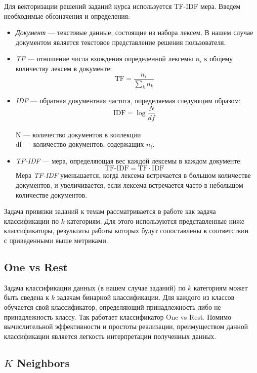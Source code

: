 \documentclass[14pt]{matmex-diploma-custom}
\begin{document}
Для векторизации решений заданий курса используется TF-IDF мера. Введем необходимые обозначения и определения:

\begin{itemize}
    \item \textit{Документ} --- текстовые данные, состоящие из набора лексем. В нашем случае документом является текстовое представление решения пользователя.
    \item \textit{TF } --- отношение числа вхождения определенной лексемы $n_{i}$ к общему количеству лексем в документе:
    \[
    \text{TF}=\frac{n_{i}}{\sum_{k}n_{k}}
    \]
    \item \textit{IDF } --- обратная документная частота, определяемая следующим образом: 
    \[
    \text{IDF}=\log\frac{N}{df}
    \]
    \\N --- количество документов в коллекции
    \\df --- количество документов, содержащих $n_{i}$.
    \item \textit{TF-IDF} --- мера, определяющая вес каждой лексемы в каждом документе:
    \[
    \text{TF-IDF}= \text{TF}\cdot\text{IDF}
    \]
    Мера \textit{TF-IDF} уменьшается, когда лексема встречается в большом количестве документов, и увеличивается, если лексема встречается часто в небольшом количестве документов.
\end{itemize}

Задача привязки заданий к темам рассматривается в работе как задача классификации по $k$ категориям. Для этого используются представленные ниже классификаторы, результаты работы которых будут сопоставлены в соответствии с приведенными выше метриками.

\subsection*{One vs Rest}

Задача классификации данных (в нашем случае заданий) по $k$ категориям может быть сведена к $k$ задачам бинарной классификации. Для каждого из классов обучается свой классификатор, определяющий принадлежность либо не принадлежность классу. Так работает классификатор One vs Rest. Помимо вычислительной эффективности и простоты реализации, преимуществом данной классификации является легкость интерпретации полученных данных.

\subsection*{$K$ Neighbors}
\end{document}
